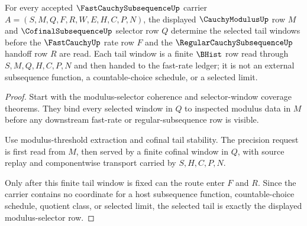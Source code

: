 \begin{theorem}
\label{thm:fast-cauchy-subsequence-modulus-selector-tail-extraction}
For every accepted $\FastCauchySubsequenceUp$ carrier $A=(S,M,Q,F,R,W,E,H,C,P,N)$, the displayed $\CauchyModulusUp$ row $M$ and $\CofinalSubsequenceUp$ selector row $Q$ determine the selected tail windows before the $\FastCauchyUp$ rate row $F$ and the $\RegularCauchySubsequenceUp$ handoff row $R$ are read. Each tail window is a finite $\BHist$ row read through $S,M,Q,H,C,P,N$ and then handed to the fast-rate ledger; it is not an external subsequence function, a countable-choice schedule, or a selected limit.
\end{theorem}
\begin{proof}
Start with the modulus-selector coherence and selector-window coverage theorems. They bind every selected window in $Q$ to inspected modulus data in $M$ before any downstream fast-rate or regular-subsequence row is visible.

Use modulus-threshold extraction and cofinal tail stability. The precision request is first read from $M$, then served by a finite cofinal window in $Q$, with source replay and componentwise transport carried by $S,H,C,P,N$.

Only after this finite tail window is fixed can the route enter $F$ and $R$. Since the carrier contains no coordinate for a host subsequence function, countable-choice schedule, quotient class, or selected limit, the selected tail is exactly the displayed modulus-selector row.
\end{proof}

